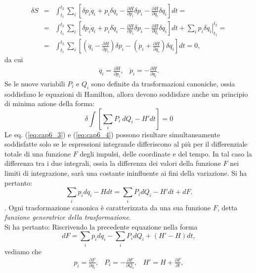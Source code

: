 \begin{eqnarray}
\delta S & =& \int _{t_1} ^{t_2} \sum _i \left[ \delta p_i \dot{q}_i + p_i \delta \dot{q}_i - \frac{\partial H}{\partial p_i} \delta p_i - \frac{\partial H}{\partial q_i}\delta q_i \right] dt = \nonumber \\
&=&\int _{t_1} ^{t_2} \sum _i \left[ \delta p_i \dot{q}_i + p_i \delta \dot{q}_i - \frac{\partial H}{\partial p_i} \delta p_i - \frac{\partial H }{\partial q_i} \delta q_i \right] dt + \left.\sum_i  p_i \delta q_i \right\vert _{t_1} ^{t_2} = \nonumber \\
&=& \int _{t_1} ^{t_2} \sum _i \left[ \left( \dot{q}_i - \frac{\partial H}{\partial p_i} \right) \delta p_i - \left( \dot{p}_i + \frac{\partial H}{\partial q_i}\right)\delta q_i \right] dt = 0 ,
\end{eqnarray}
da cui
\begin{equation}
\begin{matrix}
\dot{q}_i = \frac{\partial H}{\partial p_i} , & \dot{p}_i = - \frac{\partial H}{\partial q_i} .
\end{matrix}
\end{equation}
Se le nuove variabili $P_i$ e $Q_i$ sono definite da trasformazioni canoniche, ossia soddisfano le equazioni di Hamilton, allora devono soddisfare anche un principio di minima azione della forma:
\begin{equation}
\delta \int \left[ \sum_i P_i\ dQ_i - H'dt\right] = 0
\label{eq:cap6_4}
\end{equation}
Le eq. (\ref{eq:cap6_3}) e (\ref{eq:cap6_4}) possono risultare simultaneamente soddisfatte solo se le espressioni integrande differiscono al pi\`u per il differenziale totale di una funzione $F$ degli impulsi, delle coordinate e del tempo. In tal caso la differenza tra i due integrali, ossia la differenza dei valori della funzione $F$ nei limiti di integrazione, sar\`a una costante ininfluente ai fini della variazione. Si ha pertanto:
\begin{equation}
\sum_i p_i dq_i - Hdt = \sum_i P_i d Q_i - H'dt + dF .
\end{equation}.
Ogni trasformazione canonica \`e caratterizzata da una sua funzione $F$, detta \textit{funzione generatrice della trasformazione}.\\
Si ha pertanto:
Riscrivendo la precedente equazione nella forma
\begin{equation}
dF = \sum_i p_i d q_i - \sum_i P_i dQ_i + (H'-H)dt ,
\label{eq:cap6_5}
\end{equation}
vediamo che
\begin{equation}
\begin{matrix}
p_i = \frac{\partial F}{\partial q_i} , & P_i = - \frac{\partial F}{\partial Q_i} , & H' = H + \frac{\partial F}{\partial t} ,
\end{matrix}
\label{o}
\end{equation}
